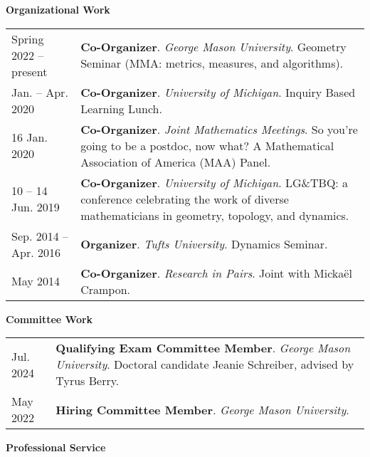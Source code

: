     \vspace{-1em}
    

    \textbf{\large Organizational Work}
    
    \begin{center}
    {
    \renewcommand{\arraystretch}{1.2}
    \begin{longtable}{p{}  p{}}
      Spring 2022 --    present & \textbf{Co-Organizer}. \textit{George Mason University}.  Geometry Seminar (MMA: metrics, measures, and algorithms).  \\ 
 Jan.  --  Apr.  2020 & \textbf{Co-Organizer}. \textit{University of Michigan}.  Inquiry Based Learning Lunch.  \\ 
16 Jan.  2020 & \textbf{Co-Organizer}. \textit{Joint Mathematics Meetings}.  So you're going to be a postdoc, now what? A Mathematical Association of America (MAA) Panel.  \\ 
10  -- 14 Jun.  2019 & \textbf{Co-Organizer}. \textit{University of Michigan}.  LG\&TBQ: a conference celebrating the work of diverse mathematicians
in geometry, topology, and dynamics.  \\ 
 Sep.  2014 --  Apr.  2016 & \textbf{Organizer}. \textit{Tufts University}.  Dynamics Seminar.  \\ 
 May  2014 & \textbf{Co-Organizer}. \textit{Research in Pairs}.  Joint with Micka\"el Crampon.  
    \end{longtable}
    } 
    \end{center}

    \vspace{-1em}
    

    \textbf{\large Committee Work}
    
    \begin{center}
    {
    \renewcommand{\arraystretch}{1.2}
    \begin{longtable}{p{}  p{}}
     Jul.  2024 & \textbf{Qualifying Exam Committee Member}. \textit{George Mason University}.  Doctoral candidate Jeanie Schreiber, advised by Tyrus Berry.  \\ 
 May  2022 & \textbf{Hiring Committee Member}. \textit{George Mason University}.  
    \end{longtable}
    } 
    \end{center}

    \vspace{-1em}
    

    \textbf{\large Professional Service}
    
